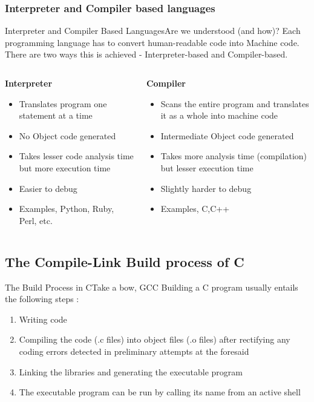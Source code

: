 \documentclass{beamer}
\begin{document}
\subsubsection{Interpreter and Compiler based languages}
\begin{frame}{Interpreter and Compiler Based Languages}{Are we understood (and how)?}
Each programming language has to convert human-readable code into Machine code. There are two ways this is achieved - Interpreter-based and Compiler-based.
\begin{columns}
\begin{column}{0.5\textwidth}
\begin{center}
\textbf{Interpreter}
\end{center}
\begin{itemize}
\item Translates program one statement at a time
\item No Object code generated
\item Takes lesser code analysis time but more execution time
\item Easier to debug
\item Examples, Python, Ruby, Perl, etc.
\end{itemize}
\end{column}
\begin{column}{0.5\textwidth}
\begin{center}
\textbf{Compiler}
\end{center}
\begin{itemize}
\item Scans the entire program and translates it as a whole into machine code
\item Intermediate Object code generated
\item Takes more analysis time (compilation) but lesser execution time
\item Slightly harder to debug
\item Examples, C,C++
\end{itemize}
\end{column}
\end{columns}
\end{frame}
\subsection{The Compile-Link Build process of C}
\begin{frame}{The Build Process in C}{Take a bow, GCC}
  Building a C program usually entails the following steps :
  \begin{enumerate}
  \item Writing code
  \item Compiling the code (.c files) into object files (.o files) after rectifying any coding errors detected in preliminary attempts at the foresaid 
  \item Linking the libraries and generating the executable program
  \item The executable program can be run by calling its name from an active shell
  \end{enumerate}
\end{frame}
\end{document}
